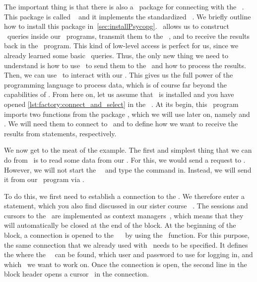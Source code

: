 The important thing is that there is also a \python\ package for connecting with the \postgresql\ \dbms.
This package is called \psycopg~\cite{VDGE2010P} and it implements the standardized ~\cite{PEP249}.
We briefly outline how to install this package in~\cref{sec:installPsycopg}.
\psycopg\ allows us to construct \sql\ queries inside our \python\ programs, transmit them to the \postgresql\ \server, and to receive the results back in the \python\ program.
This kind of low-level access is perfect for us, since we already learned some basic \sql\ queries.
Thus, the only new thing we need to understand is how to use \psycopg\ to send them to the \dbms\ and how to process the results.
Then, we can use \python\ to interact with our .
This gives us the full power of the programming language to process data, which is of course far beyond the capabilities of \sql.%
%
%
%
%
%
%
From here on, let us assume that \psycopg\ is installed and you have opened \cref{lst:factory:connect_and_select} in the \pycharm\ .
At its begin, this \python\ program imports two functions from the package \psycopg, which we will use later on, namely  and .
We will need them to connect to \postgresql\ and to define how we want to receive the results from  statements, respectively.

We now get to the meat of the example.
The first and simplest thing that we can do from \python\ is to read some data from our \db.
For this, we would send a  request to \postgresql.
However, we will not start the \psql\ \client\ and type the command in.
Instead, we will send it from our \python\ program via \psycopg.

To do this, we first need to establish a connection to the \db.
We therefore enter a  statement, which you also find discussed in our sister course ~\cite{programmingWithPython}.
The sessions and cursors to the \db\ are implemented as context managers~\cite{PSF:P3D:TPLR:WSCM}, which means that they will automatically be closed at the end of the  block.
At the beginning of the block, a connection  is opened to the \postgresql\ \dbms~\cite{VDGE2022PPDAFP:CC1} by using the ~function.
For this purpose, the same connection  that we already used with \psql\ needs to be specified.
It defines the where the \postgresql\ \server\ can be found, which user and password to use for logging in, and which \db\ we want to work on.
Once the connection is open, the second line in the  block header opens a cursor~\cite{PEP249,VDGE2022PPDAFP:CC2} in the connection.

